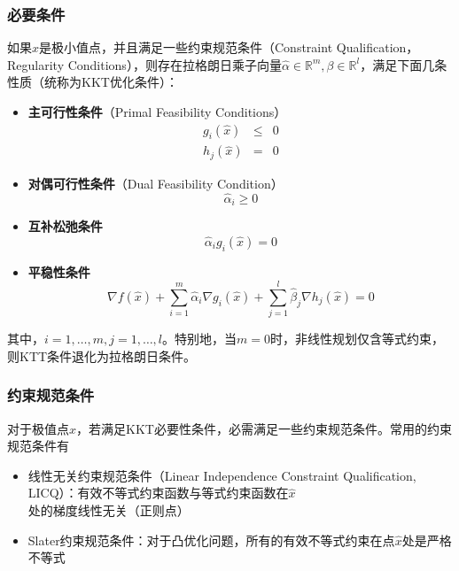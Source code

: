 \subsubsection{必要条件}
如果$\hat x$是极小值点，并且满足一些约束规范条件（Constraint Qualification，Regularity Conditions），则存在拉格朗日乘子向量$\hat \alpha \in \mathbb{R}^m,\beta\in \mathbb{R}^l$，满足下面几条性质（统称为KKT优化条件）：
\begin{itemize}
  \item \textbf{主可行性条件}（Primal Feasibility Conditions）
  \begin{equation}
    \begin{array}{ccc}
      g_i(\hat x) & \le & 0 \\
      h_j(\hat x) & = & 0
    \end{array}
  \end{equation}
  \item \textbf{对偶可行性条件}（Dual Feasibility Condition）
  \begin{equation}
    \hat\alpha_i \ge 0
  \end{equation}
  \item \textbf{互补松弛条件}
  \begin{equation}
    \hat\alpha_i g_i(\hat x) = 0
  \end{equation}
  \item \textbf{平稳性条件}
  \begin{equation}
    \nabla f(\hat x) + \sum\limits_{i=1}^m \hat\alpha_i \nabla g_i(\hat x) + \sum\limits_{j=1}^l \hat\beta_j \nabla h_j(\hat x)=0
  \end{equation}
\end{itemize}
其中，$i = 1, \ldots, m, j = 1,\ldots, l$。特别地，当$m=0$时，非线性规划仅含等式约束，则KTT条件退化为拉格朗日条件。

\subsubsection{约束规范条件}
对于极值点$\hat x$，若满足KKT必要性条件，必需满足一些约束规范条件。常用的约束规范条件有
\begin{itemize}
  \item 线性无关约束规范条件（Linear Independence Constraint Qualification, LICQ）：有效不等式约束函数与等式约束函数在$\hat x$处的梯度线性无关（正则点）
  \item Slater约束规范条件：对于凸优化问题，所有的有效不等式约束在点$\hat x$处是严格不等式
\end{itemize}

